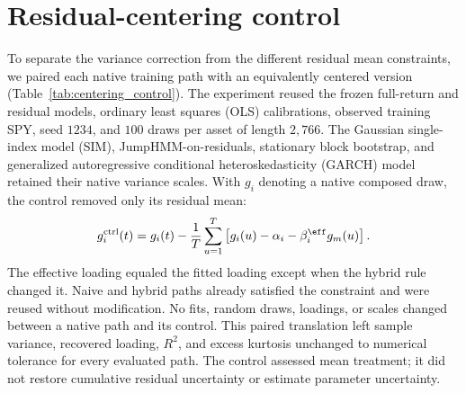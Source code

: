 \begin{table}[H]
  \centering
  \caption{\textbf{Episode incidence and breadth of the temporal
    change in the multi-asset jump comparison.} SPY paths with an
    episode are counted over the $1{,}000$ jump-enabled market
    replications per window. Asset paths with an episode is the mean
    jump-active share across the enabled asset generators. The last
    two columns give the share of assets whose mean absolute-return
    autocorrelation error through lag $25$ fell under corrected
    composition when jumps were enabled in the market only, or in the
    market and the assets, relative to jumps disabled.}
  \label{tab:jump_ablation_episodes}
  \footnotesize
  \setlength{\tabcolsep}{4pt}
  \resizebox{\textwidth}{!}{}
\end{table}


\clearpage
\section{Residual-centering control}
\label{sec:supp-centering-control}

To separate the variance correction from the different residual mean
constraints, we paired each native training path with an equivalently
centered version (Table~\ref{tab:centering_control}). The experiment
reused the frozen full-return and residual models, ordinary least
squares (OLS) calibrations, observed training SPY, seed $1234$, and
$100$ draws per asset of length $2{,}766$. The Gaussian single-index
model (SIM), JumpHMM-on-residuals, stationary block bootstrap, and
generalized autoregressive conditional heteroskedasticity (GARCH)
model retained their native variance scales. With $g_i$ denoting a
native composed draw, the control removed only its residual mean:
\begin{equation}
  g_i^{\mathrm{ctrl}}(t)
  = g_i(t)-\frac{1}{T}\sum_{u=1}^{T}
    \left[g_i(u)-\alpha_i-\beta_i^{\eff}g_m(u)\right].
  \label{eq:supp-centering-control}
\end{equation}
The effective loading equaled the fitted loading except when the
hybrid rule changed it. Naive and hybrid paths already satisfied the
constraint and were reused without modification. No fits, random
draws, loadings, or scales changed between a native path and its
control. This paired translation left sample variance, recovered
loading, $R^2$, and excess kurtosis unchanged to numerical tolerance
for every evaluated path. The control assessed mean treatment; it did
not restore cumulative residual uncertainty or estimate parameter
uncertainty.

